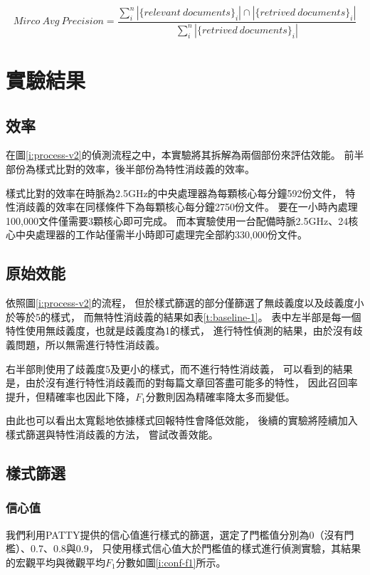 \begin{equation}
    \label{f:micro}
    Mirco\ Avg\ Precision=\frac{\sum_i^n |\{relevant\ documents\}_i|\cap|\{retrived\ documents\}_i|}{\sum_i^n |\{retrived\ documents\}_i|}
\end{equation}

\section{實驗結果}
\label{s:result}

\subsection{效率}
在圖\ref{i:process-v2}的偵測流程之中，本實驗將其拆解為兩個部份來評估效能。
前半部份為樣式比對的效率，後半部份為特性消歧義的效率。

樣式比對的效率在時脈為2.5GHz的中央處理器為每顆核心每分鐘592份文件，
特性消歧義的效率在同樣條件下為每顆核心每分鐘2750份文件。
要在一小時內處理100,000文件僅需要3顆核心即可完成。
而本實驗使用一台配備時脈2.5GHz、24核心中央處理器的工作站僅需半小時即可處理完全部約330,000份文件。

\subsection{原始效能}
依照圖\ref{i:process-v2}的流程，
但於樣式篩選的部分僅篩選了無歧義度以及歧義度小於等於5的樣式，
而無特性消歧義的結果如表\ref{t:baseline-1}。
表中左半部是每一個特性使用無歧義度，也就是歧義度為1的樣式，
進行特性偵測的結果，由於沒有歧義問題，所以無需進行特性消歧義。

右半部則使用了歧義度5及更小的樣式，而不進行特性消歧義，
可以看到的結果是，由於沒有進行特性消歧義而的對每篇文章回答盡可能多的特性，
因此召回率提升，但精確率也因此下降，$F_1$分數則因為精確率降太多而變低。

由此也可以看出太寬鬆地依據樣式回報特性會降低效能，
後續的實驗將陸續加入樣式篩選與特性消歧義的方法， 嘗試改善效能。



\subsection{樣式篩選}
\subsubsection{信心值}
我們利用PATTY提供的信心值進行樣式的篩選，選定了門檻值分別為0（沒有門檻）、0.7、0.8與0.9，
只使用樣式信心值大於門檻值的樣式進行偵測實驗，其結果的宏觀平均與微觀平均$F_1$分數如圖\ref{i:conf-f1}所示。


